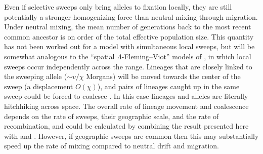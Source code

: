 \documentclass{article}
\newcommand{\plr}[1]{{\it\color{blue}#1}}
\begin{document}
Even if selective sweeps only bring alleles to fixation locally,
they are still potentially a stronger homogenizing force
than neutral mixing through migration.
Under neutral mixing, the mean number of generations back to the most recent common ancestor
is on order of the total effective population size.
This quantity has not been worked out for a model with simultaneous local sweeps,
but will be somewhat analogous to the ``spatial $\Lambda$-Fleming--Viot'' models of \citet{barton2013modelling},
in which local sweeps occur independently across the range.
Lineages that are closely linked to the sweeping allele ($\sim v/\chi$ Morgans) will be moved
towards the center of the sweep (a displacement $O(\chi)$), 
and pairs of lineages caught up in the same sweep could be forced to coalesce 
\citep[see ][for work on geographic
hitchhiking]{barton2013genetic}. In this case lineages and alleles are literally
hitchhiking across space.
The overall rate of lineage movement and coalescence
depends on the rate of sweeps, their geographic scale, and the rate of recombination,
and could be calculated by combining the result presented here with
\citet{barton2013modelling} and \citet{barton2013genetic}. 
However, if geographic sweeps are common
then this may substantially speed up the rate of mixing compared to
neutral drift and migration. 

\end{document}
